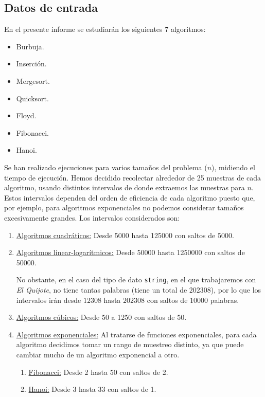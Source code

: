 \documentclass[12pt]{article}
\begin{document}
    \subsection{Datos de entrada}
    En el presente informe se estudiarán los siguientes $7$ algoritmos:
    \begin{itemize}
        \item Burbuja.
        \item Inserción.
        \item Mergesort.
        \item Quicksort.
        \item Floyd.
        \item Fibonacci.
        \item Hanoi.
    \end{itemize}
    Se han realizado ejecuciones para varios tamaños del problema ($n$), midiendo el tiempo de ejecución. Hemos decidido recolectar alrededor de 25 muestras de cada algoritmo, usando distintos intervalos de donde extraemos las muestras para $n$. Estos intervalos dependen del orden de eficiencia de cada algoritmo puesto que, por ejemplo, para algoritmos exponenciales no podemos considerar tamaños excesivamente grandes.
    Los intervalos considerados son:
    \begin{enumerate}
        \item \ul{Algoritmos cuadráticos:} Desde 5000 hasta 125000 con saltos de 5000.
        \item \ul{Algoritmos linear-logarítmicos:} Desde 50000 hasta 1250000 con saltos de 50000.

        No obstante, en el caso del tipo de dato \verb|string|, en el que trabajaremos con \emph{El Quijote}, no tiene tantas palabras (tiene un total de $202308$), por
        lo que los intervalos irán desde $12308$ hasta $202308$ con saltos de $10000$ palabras.
        \item \ul{Algoritmos cúbicos:} Desde 50 a 1250 con saltos de 50.
        \item \ul{Algoritmos exponenciales:}
        Al tratarse de funciones exponenciales, para cada algoritmo decidimos tomar un rango de muestreo distinto, ya que puede cambiar mucho de un algoritmo exponencial a otro.
        \begin{enumerate}
            \item \ul{Fibonacci:} Desde 2 hasta 50 con saltos de 2.
            \item \ul{Hanoi:} Desde 3 hasta 33 con saltos de 1.
        \end{enumerate}
    \end{enumerate}
\end{document}
